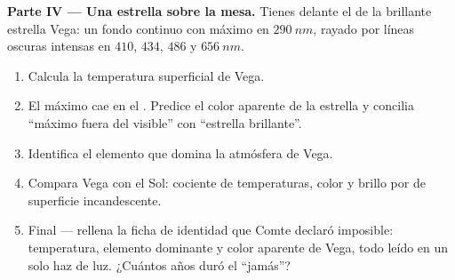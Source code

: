 \begin{problem}
\medskip
\noindent\textbf{Parte IV --- Una estrella sobre la mesa.}
Tienes delante el  de la brillante estrella Vega: un fondo
continuo con máximo en $\qty{290}{nm}$, rayado por líneas oscuras
intensas en $410$, $434$, $486$ y $\qty{656}{nm}$.
\begin{enumerate}[resume]
  \item Calcula la temperatura superficial de Vega.
  \item El máximo cae en el . Predice el color aparente de
        la estrella y concilia ``máximo fuera del visible'' con
        ``estrella brillante''.
  \item Identifica el elemento que domina la atmósfera de Vega.
  \item Compara Vega con el Sol: cociente de temperaturas, color y
        brillo por  de superficie incandescente.
  \item Final --- rellena la ficha de identidad que Comte declaró
        imposible: temperatura, elemento dominante y color aparente de
        Vega, todo leído en un solo haz de luz. ¿Cuántos años duró el
        ``jamás''?
\end{enumerate}
\end{problem}
